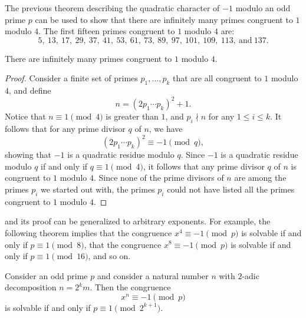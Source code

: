 The previous theorem describing the quadratic character of $-1$ modulo an odd prime $p$ can be used to show that there are infinitely many primes congruent to $1$ modulo $4$. The first fifteen primes congruent to $1$ modulo $4$ are:
\begin{equation*}
  5,~13,~17,~29,~37,~41,~53,~61,~73,~89,~97,~101,~109,~113,~\text{and}~137.
\end{equation*}

\begin{theorem}
  There are infinitely many primes congruent to $1$ modulo $4$.
\end{theorem}

\begin{proof}
  Consider a finite set of primes $p_1,\ldots,p_k$ that are all congruent to $1$ modulo $4$, and define
  \begin{equation*}
    n = (2p_1\cdots p_k)^2 + 1.
  \end{equation*}
  Notice that $n\equiv 1\pmod{4}$ is greater than $1$, and $p_i\nmid n$ for any $1\leq i\leq k$. It follows that for any prime divisor $q$ of $n$, we have
  \begin{equation*}
    (2p_1\cdots p_k)^2\equiv -1\pmod{q},
  \end{equation*}
  showing that $-1$ is a quadratic residue modulo $q$. Since $-1$ is a quadratic residue modulo $q$ if and only if $q\equiv 1\pmod{4}$, it follows that any prime divisor $q$ of $n$ is congruent to $1$ modulo $4$. Since none of the prime divisors of $n$ are among the primes $p_i$ we started out with, the primes $p_i$ could not have listed all the primes congruent to $1$ modulo $4$.
\end{proof}

 and its proof can be generalized to arbitrary exponents. For example, the following theorem implies that the congruence $x^4\equiv -1\pmod{p}$ is solvable if and only if $p\equiv 1\pmod{8}$, that the congruence $x^8\equiv -1\pmod{p}$ is solvable if and only if $p\equiv 1\pmod{16}$, and so on.

\begin{theorem}
  Consider an odd prime $p$ and consider a natural number $n$ with $2$-adic decomposition $n=2^km$. Then the congruence
  \begin{equation*}
    x^n \equiv -1\pmod{p}
  \end{equation*}
  is solvable if and only if $p\equiv 1\pmod{2^{k+1}}$.
\end{theorem}


